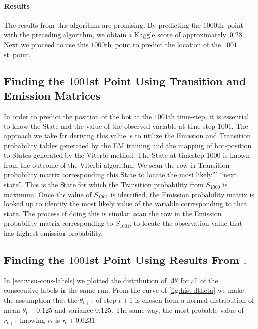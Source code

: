 \documentclass[twoside]{article}
\begin{document}
\paragraph{Results}

The results from this algorithm are promising.
By predicting the $\num{1000}$th~point with the preceding algorithm, we obtain a Kaggle score of approximately~$0.28$.
Next we proceed to use this $\num{1000}$th~point to predict the location of the $\num{1001}$st~point.

\subsection{Finding the $\num{1001}$st Point Using Transition and Emission Matrices}\label{sec:find-num1001st-point}

In order to predict the position of the bot at the $\num{1001}$th time-step, it is essential to know the State and the value of the observed variable at time-step $\num{1001}$.
The approach we take for deriving this value is to utilize the Emission and Transition probability tables generated by the EM training and the mapping of bot-position to States generated by the Viterbi method.
The State at timestep $\num{1000}$ is known from the outcome of the Viterbi algorithm.
We scan the row in Transition probability matrix corresponding this State to locate the most likely''' ``next state''.
This is the State for which the Transition probability from $S_{\num{1000}}$ is maximum.
Once the value of $S_{\num{1001}}$ is identified, the Emission probability matrix is looked up to identify the most likely value of the variable corresponding to that state.
The process of doing this is similar: scan the row in the Emission probability matrix corresponding to $S_{\num{1001}}$, to locate the observation value that has highest emission probability.

\subsection{Finding the $\num{1001}$st Point Using Results From .}\label{sec:finding-1001-angles}

In \cref{sec:visu-cons-labels} we plotted the distribution of~${\mathop{}\!\mathrm{d} \theta}$ for all of the consecutive labels in the same run.
From the curve of \cref{fig:hist-dtheta} we make the assumption that the $\theta_{t+1}$ of step ${t+1}$ is chosen form a normal distribution of mean ${\theta_t + 0.125}$ and variance $0.125$.
The same way, the most probable value of $r_{t+1}$ knowing $r_t$ is $r_t + 0.0231$.
\end{document}
